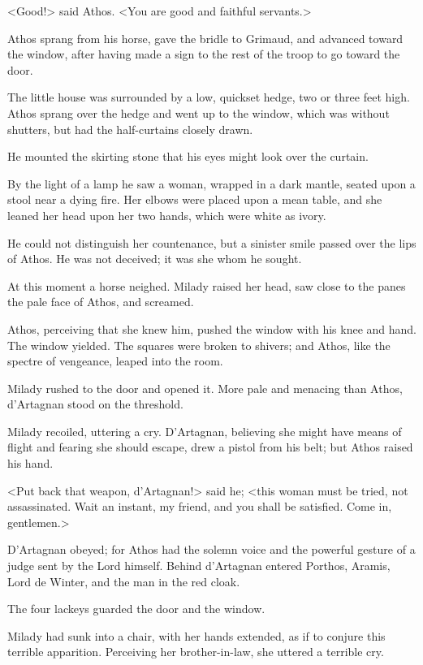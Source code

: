 <Good!> said Athos. <You are good and faithful servants.> 

Athos sprang from his horse, gave the bridle to Grimaud, and advanced toward the window, after having made a sign to the rest of the troop to go toward the door. 

The little house was surrounded by a low, quickset hedge, two or three feet high. Athos sprang over the hedge and went up to the window, which was without shutters, but had the half-curtains closely drawn. 

He mounted the skirting stone that his eyes might look over the curtain. 

By the light of a lamp he saw a woman, wrapped in a dark mantle, seated upon a stool near a dying fire. Her elbows were placed upon a mean table, and she leaned her head upon her two hands, which were white as ivory. 

He could not distinguish her countenance, but a sinister smile passed over the lips of Athos. He was not deceived; it was she whom he sought. 

At this moment a horse neighed. Milady raised her head, saw close to the panes the pale face of Athos, and screamed. 

Athos, perceiving that she knew him, pushed the window with his knee and hand. The window yielded. The squares were broken to shivers; and Athos, like the spectre of vengeance, leaped into the room. 

Milady rushed to the door and opened it. More pale and menacing than Athos, d'Artagnan stood on the threshold. 

Milady recoiled, uttering a cry. D'Artagnan, believing she might have means of flight and fearing she should escape, drew a pistol from his belt; but Athos raised his hand. 

<Put back that weapon, d'Artagnan!> said he; <this woman must be tried, not assassinated. Wait an instant, my friend, and you shall be satisfied. Come in, gentlemen.> 

D'Artagnan obeyed; for Athos had the solemn voice and the powerful gesture of a judge sent by the Lord himself. Behind d'Artagnan entered Porthos, Aramis, Lord de Winter, and the man in the red cloak. 

The four lackeys guarded the door and the window. 

Milady had sunk into a chair, with her hands extended, as if to conjure this terrible apparition. Perceiving her brother-in-law, she uttered a terrible cry. 


